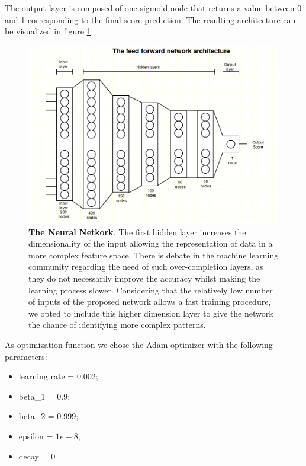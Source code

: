 The output layer is composed of one sigmoid node that returns a value between 0 and 1 corresponding to the final score prediction. The resulting architecture can be visualized in figure \ref{fig:NN}.

\begin{figure}[hbt!]
	\centering
	\includegraphics[width=\textwidth, height=0.52\textheight]{Figures/NN}
	\caption{\textbf{The Neural Netkork}. The first hidden layer increases the dimensionality of the input allowing the representation of data in a more complex feature space. There is debate in the machine learning community regarding the need of such over-completion layers, as they do not necessarily improve the accuracy whilst making the learning process slower. Considering that the relatively low number of inputs of the proposed network allows a fast training procedure, we opted to include this higher dimension layer to give the network the chance of identifying more complex patterns.}
	\label{fig:NN}
\end{figure}
 

As optimization function we chose the Adam optimizer with the following parameters:

\begin{itemize}
	\item learning rate = 0.002;
	\item beta\_1 = 0.9;
	\item beta\_2 = 0.999;
	\item epsilon = $1e-8$;
	\item decay = 0
\end{itemize}